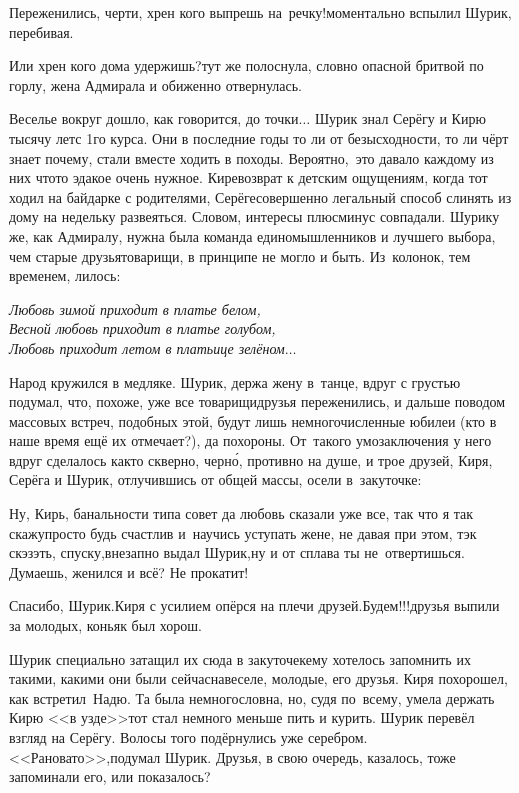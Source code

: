 {\diagdash Переженились, черти, хрен кого выпрешь на~речку!\mdash моментально вспылил Шурик, перебивая.

\diagdash Или хрен кого дома удержишь?\mdash тут же полоснула, словно опасной бритвой по горлу, жена Адмирала и обиженно отвернулась. 

Веселье вокруг дошло, как говорится, до точки$\ldots$ Шурик знал Серёгу и Кирю тысячу лет\mdash с 1\sdash го курса. Они в последние годы то ли от безысходности, то ли чёрт знает почему, стали вместе ходить в походы. Вероятно,~это давало каждому из них что\sdash то эдакое очень нужное. Кире\mdash возврат к детским ощущениям, когда тот ходил на байдарке с родителями, Серёге\mdash совершенно легальный способ слинять из дому на недельку развеяться. Словом, интересы плюс\sdash минус совпадали. Шурику же, как Адмиралу, нужна была команда единомышленников и лучшего выбора, чем старые друзья\sdash товарищи, в принципе не могло и быть. Из~колонок, тем временем, лилось:

\vspace{0.1cm}
\noindent\textit{%
	\hspace*{1.4cm}Любовь зимой приходит в платье белом,\\
	\hspace*{1.4cm}Весной любовь приходит в платье голубом,\\
	\hspace*{1.4cm}Любовь приходит летом в платьице зелёном$\ldots$
}

Народ кружился в медляке. Шурик, держа жену в~танце, вдруг с грустью подумал, что, похоже, уже все товарищи\sdash друзья переженились, и дальше поводом массовых встреч, подобных этой, будут лишь немногочисленные юбилеи (кто в наше время ещё их отмечает?), да похороны. От~такого умозаключения у него вдруг сделалось как\sdash то скверно, черн\'{о}, противно на душе, и трое друзей, Киря, Серёга и Шурик, отлучившись от общей массы, осели в~закуточке:

\diagdash Ну, Кирь, банальности типа совет да любовь сказали уже все, так что я так скажу\mdash просто будь счастлив и~научись уступать жене, не давая при этом, тэк скэзэть, спуску,\mdash внезапно выдал Шурик,\mdash ну и от сплава ты не~отвертишься. Думаешь, женился и всё? Не прокатит!

\diagdash Спасибо, Шурик.\mdash Киря с усилием опёрся на плечи друзей.\mdash Будем!!!\mdash друзья выпили за молодых, коньяк был хорош.

Шурик специально затащил их сюда в закуточек\mdash ему хотелось запомнить их такими, какими они были сейчас\mdash навеселе, молодые, его друзья. Киря похорошел, как встретил~Надю. Та была немногословна, но, судя по~всему, умела держать Кирю <<в узде>>\mdash тот стал немного меньше пить и курить. Шурик перевёл взгляд на Серёгу. Волосы того подёрнулись уже серебром. <<Рановато>>,\mdash подумал Шурик. Друзья, в свою очередь, казалось, тоже запоминали его, или показалось?

}
